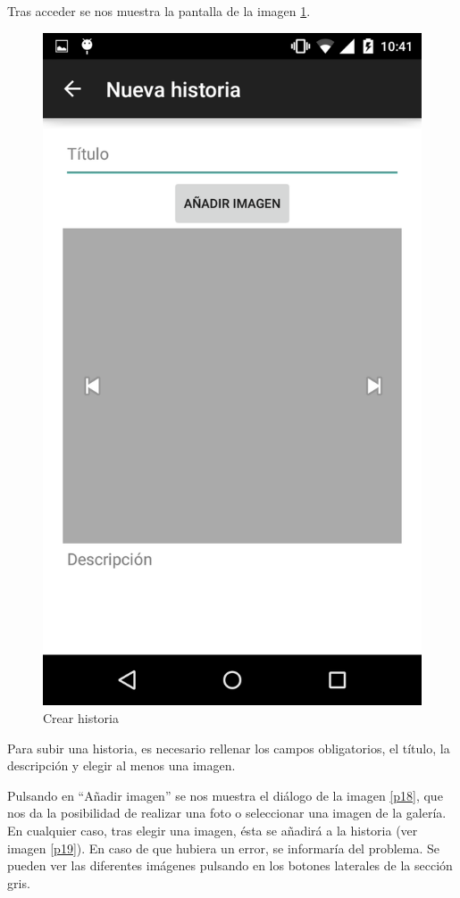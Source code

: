 \documentclass[11pt,a4paper, titlepage]{article}
\begin{document}
	Tras acceder se nos muestra la pantalla de la imagen \ref{p17}.
	\begin{figure}[hbtp]
		\centering
		\includegraphics[scale = 0.25 ]{img/10}
		\caption{Crear historia}
		\label{p17}
	\end{figure}
	
	Para subir una historia, es necesario rellenar los campos obligatorios, el título, la descripción y elegir al menos una imagen.
	
	Pulsando en ``Añadir imagen'' se nos muestra el diálogo de la imagen \ref{p18}, que nos da la posibilidad de realizar una foto o seleccionar una imagen de la galería. En cualquier caso, tras elegir una imagen, ésta se añadirá a la historia (ver imagen \ref{p19}). En caso de que hubiera un error, se informaría del problema. Se pueden ver las diferentes imágenes pulsando en los botones laterales de la sección gris.
	
\end{document}
